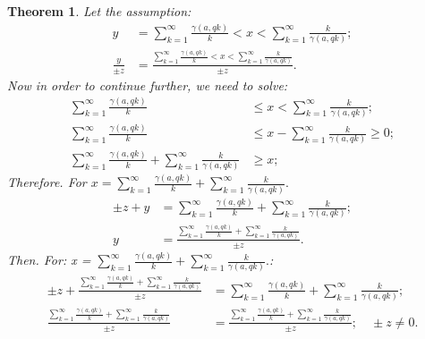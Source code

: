 \documentclass[10pt]{article}
\theoremstyle{plain}
\newtheorem{theorem}{Theorem}[section]
\theoremstyle{definition}
\theoremstyle{remark}
\begin{document}
	\begin{theorem}
		Let the assumption:
		\begin{align*}
			y &= \sum_{k=1}^{\infty} \frac{\gamma(a, qk)}{k} < x < \sum_{k=1}^{\infty} \frac{k}{\gamma(a, qk)};\\
			\frac{y}{\pm z} &= \frac{\sum_{k=1}^{\infty} \frac{\gamma(a, qk)}{k} < x < \sum_{k=1}^{\infty} \frac{k}{\gamma(a, qk)}}{\pm z}.
		\end{align*}
		Now in order to continue further, we need to solve:
		\begin{align*}
			\sum_{k=1}^{\infty} \frac{\gamma(a, qk)}{k} &\leq x < \sum_{k=1}^{\infty} \frac{k}{\gamma(a, qk)};\\
			\sum_{k=1}^{\infty} \frac{\gamma(a, qk)}{k} &\leq x - \sum_{k=1}^{\infty} \frac{k}{\gamma(a, qk)} \geq 0;\\
			\sum_{k=1}^{\infty} \frac{\gamma(a, qk)}{k} + \sum_{k=1}^{\infty} \frac{k}{\gamma(a, qk)} &\geq x;
		\end{align*}
		Therefore. For $x = \sum_{k=1}^{\infty} \frac{\gamma(a, qk)}{k} + \sum_{k=1}^{\infty} \frac{k}{\gamma(a, qk)}.$
		\begin{align*}
			\pm z + y &= \sum_{k=1}^{\infty} \frac{\gamma(a, qk)}{k} + \sum_{k=1}^{\infty} \frac{k}{\gamma(a, qk)};\\
			y &= \frac{\sum_{k=1}^{\infty} \frac{\gamma(a, qk)}{k} + \sum_{k=1}^{\infty} \frac{k}{\gamma(a, qk)}}{\pm z}.
		\end{align*}
		Then. For: x = $\sum_{k=1}^{\infty} \frac{\gamma(a, qk)}{k} + \sum_{k=1}^{\infty} \frac{k}{\gamma(a, qk)}.$:
		\begin{align*}
			\pm z + \frac{\sum_{k=1}^{\infty} \frac{\gamma(a, qk)}{k} + \sum_{k=1}^{\infty}\frac{k}{\gamma(a, qk)}}{\pm z} &= \sum_{k=1}^{\infty} \frac{\gamma(a, qk)}{k} + \sum_{k=1}^{\infty}\frac{k}{\gamma(a, qk)};\\
			\frac{\sum_{k=1}^{\infty} \frac{\gamma(a, qk)}{k} + \sum_{k=1}^{\infty} \frac{k}{\gamma(a, qk)}}{\pm z} &= \frac{\sum_{k=1}^{\infty} \frac{\gamma(a, qk)}{k} + \sum_{k=1}^{\infty} \frac{k}{\gamma(a, qk)}}{\pm z}; \quad \pm z \neq 0.
		\end{align*}
	\end{theorem}
	
	\nocite{*}
	
	
	
	
\end{document}
